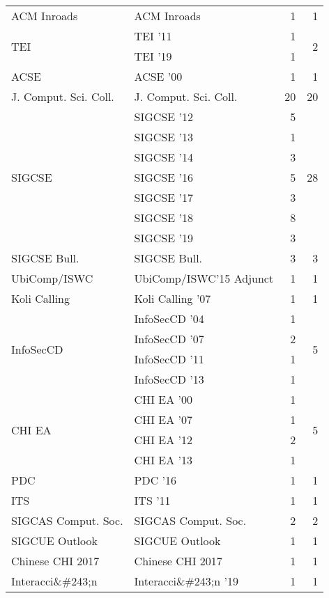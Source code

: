 \begin{table*}[t]
\begin{tabular}{llrr}
\multirow{1}{*}{ACM Inroads} & ACM Inroads & 1 & \multirow{1}{*}{1}\\
\multirow{2}{*}{TEI } & TEI '11 & 1 & \multirow{2}{*}{2}\\
& TEI '19 & 1 &\\
\multirow{1}{*}{ACSE } & ACSE '00 & 1 & \multirow{1}{*}{1}\\
\multirow{1}{*}{J. Comput. Sci. Coll.} & J. Comput. Sci. Coll. & 20 & \multirow{1}{*}{20}\\
\multirow{7}{*}{SIGCSE } & SIGCSE '12 & 5 & \multirow{7}{*}{28}\\
& SIGCSE '13 & 1 &\\
& SIGCSE '14 & 3 &\\
& SIGCSE '16 & 5 &\\
& SIGCSE '17 & 3 &\\
& SIGCSE '18 & 8 &\\
& SIGCSE '19 & 3 &\\
\multirow{1}{*}{SIGCSE Bull.} & SIGCSE Bull. & 3 & \multirow{1}{*}{3}\\
\multirow{1}{*}{UbiComp/ISWC} & UbiComp/ISWC'15 Adjunct & 1 & \multirow{1}{*}{1}\\
\multirow{1}{*}{Koli Calling } & Koli Calling '07 & 1 & \multirow{1}{*}{1}\\
\multirow{4}{*}{InfoSecCD } & InfoSecCD '04 & 1 & \multirow{4}{*}{5}\\
& InfoSecCD '07 & 2 &\\
& InfoSecCD '11 & 1 &\\
& InfoSecCD '13 & 1 &\\
\multirow{4}{*}{CHI EA } & CHI EA '00 & 1 & \multirow{4}{*}{5}\\
& CHI EA '07 & 1 &\\
& CHI EA '12 & 2 &\\
& CHI EA '13 & 1 &\\
\multirow{1}{*}{PDC } & PDC '16 & 1 & \multirow{1}{*}{1}\\
\multirow{1}{*}{ITS } & ITS '11 & 1 & \multirow{1}{*}{1}\\
\multirow{1}{*}{SIGCAS Comput. Soc.} & SIGCAS Comput. Soc. & 2 & \multirow{1}{*}{2}\\
\multirow{1}{*}{SIGCUE Outlook} & SIGCUE Outlook & 1 & \multirow{1}{*}{1}\\
\multirow{1}{*}{Chinese CHI 2017} & Chinese CHI 2017 & 1 & \multirow{1}{*}{1}\\
\multirow{1}{*}{Interacci\&\#243;n } & Interacci\&\#243;n '19 & 1 & \multirow{1}{*}{1}\\

\end{tabular}
\end{table*}
